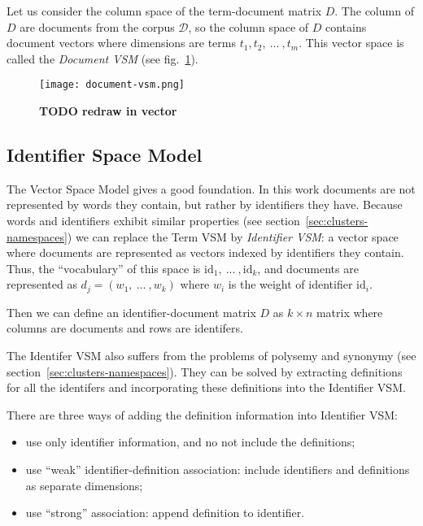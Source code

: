 Let us consider the column space of the term-document matrix $D$.
The column of $D$ are documents from the corpus $\mathcal D$,
so the column space of $D$ contains document vectors where
dimensions are terms $t_1,  t_2, \ ... \ , t_m$. This vector space is
called the \emph{Document VSM} (see fig.~\ref{fig:document-vsm}).

\begin{figure}[h]
\centering\texttt{[image: document-vsm.png]}
\caption{\textbf{TODO redraw in vector}}
\label{fig:document-vsm}
\end{figure}


\subsection{Identifier Space Model} \label{sec:ism}

The Vector Space Model gives a good foundation. In this work documents
are not represented by words they contain, but rather by identifiers they
have. Because  words and identifiers exhibit similar properties
(see section~\ref{sec:clusters-namespaces}) we can replace the
Term VSM by \emph{Identifier VSM}: a vector space where documents are represented as
vectors indexed by identifiers they contain.
Thus, the ``vocabulary'' of this space is $\text{id}_1, \ ... \ , \text{id}_k$, and
documents are represented as $d_j = (w_1, \ ... \ , w_k)$ where
$w_i$ is the weight of identifier $\text{id}_i$.

Then we can define an identifier-document matrix $D$ as $k \times n$
matrix where columns are documents and rows are identifers.

The Identifer VSM also suffers from the problems of polysemy
and synonymy (see section~\ref{sec:clusters-namespaces}). They
can be solved by extracting definitions for all the identifers
and incorporating these definitions into the Identifier VSM.

There are three ways of adding the definition information into
Identifier VSM:


\begin{itemize}
\itemsep1pt\parskip0pt
  \item use only identifier information, and no not include the definitions;
  \item use ``weak'' identifier-definition association: include identifiers and
        definitions as separate dimensions;
  \item use ``strong'' association: append definition to identifier.
\end{itemize}

